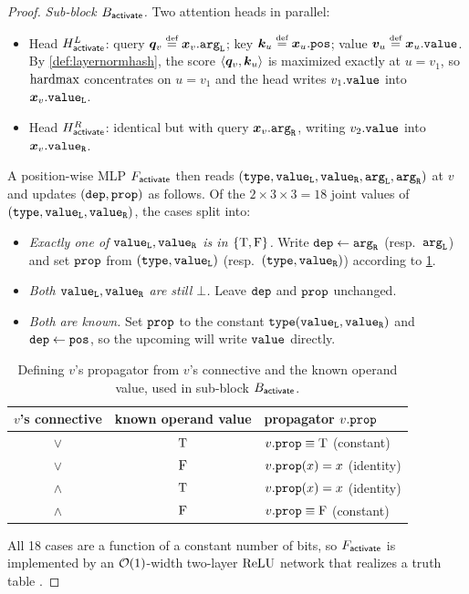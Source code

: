 \documentclass{article}
\begin{document}
\begin{proof}
    \emph{Sub-block $B_{{\textsf{activate}}}$.}
    Two attention heads in parallel:
    \begin{itemize}[noitemsep,topsep=0pt,leftmargin=15pt,parsep=0pt]
        \item Head $H^L_{{\textsf{activate}}}$: query $\vq_v \defeq \vx_v.\fargL$; key $\vk_u \defeq \vx_u.\fpos$; value $\vv_u \defeq \vx_u.\fval$. By \cref{def:layernormhash}, the score $\langle {{{ \bm{q}}}}_v, {{{ \bm{k}}}}_u \rangle$ is maximized exactly at $u = v_1$, so ${{\mathrm{hardmax}}}$ concentrates on $u = v_1$ and the head writes $v_1.{\mathtt{value}}$ into ${{{ \bm{x}}}}_v.{\mathtt{value}_\mathtt{L}}$.
        \item Head $H^R_{{\textsf{activate}}}$: identical but with query ${{{ \bm{x}}}}_v.{\mathtt{arg}_\mathtt{R}}$, writing $v_2.{\mathtt{value}}$ into ${{{ \bm{x}}}}_v.{\mathtt{value}_\mathtt{R}}$.
    \end{itemize}
    A position-wise MLP $F_{{\textsf{activate}}}$ then reads $({\mathtt{type}}, {\mathtt{value}_\mathtt{L}}, {\mathtt{value}_\mathtt{R}}, {\mathtt{arg}_\mathtt{L}}, {\mathtt{arg}_\mathtt{R}})$ at $v$ and updates $({\mathtt{dep}}, {\mathtt{prop}})$ as follows.
    Of the $2 \times 3 \times 3 = 18$ joint values of $({\mathtt{type}}, {\mathtt{value}_\mathtt{L}}, {\mathtt{value}_\mathtt{R}})$, the cases split into:
    \begin{itemize}[noitemsep,topsep=0pt,leftmargin=15pt,parsep=0pt]
        \item \emph{Exactly one of ${\mathtt{value}_\mathtt{L}}, {\mathtt{value}_\mathtt{R}}$ is in ${{\{ {\mathbin{\mathrm{T}}}, {\mathbin{\mathrm{F}}} \}}}$.} Write ${\mathtt{dep}} \gets {\mathtt{arg}_\mathtt{R}}$ (resp.\ ${\mathtt{arg}_\mathtt{L}}$) and set ${\mathtt{prop}}$ from $({\mathtt{type}}, {\mathtt{value}_\mathtt{L}})$ (resp.\ $({\mathtt{type}}, {\mathtt{value}_\mathtt{R}})$) according to \cref{tab:activate}.
        \item \emph{Both ${\mathtt{value}_\mathtt{L}}, {\mathtt{value}_\mathtt{R}}$ are still $\bot$.} Leave ${\mathtt{dep}}$ and ${\mathtt{prop}}$ unchanged.
        \item \emph{Both are known.} Set ${\mathtt{prop}}$ to the constant ${\mathtt{type}}({\mathtt{value}_\mathtt{L}}, {\mathtt{value}_\mathtt{R}})$ and ${\mathtt{dep}} \gets {\mathtt{pos}}$, so the upcoming \pebbleStep will write ${\mathtt{value}}$ directly.
    \end{itemize}
    \begin{table}[H]
        \centering
        \begin{tabular}{@{}ccl@{}}
            \toprule
            $v$'s connective & known operand value & propagator $v.{\mathtt{prop}}$ \\
            \midrule
            $\lor$  & ${\mathbin{\mathrm{T}}}$  & $v.{\mathtt{prop}} \equiv {\mathbin{\mathrm{T}}}$ (constant) \\
            $\lor$  & ${\mathbin{\mathrm{F}}}$ & $v.{\mathtt{prop}}(x) = x$ (identity) \\
            $\land$ & ${\mathbin{\mathrm{T}}}$  & $v.{\mathtt{prop}}(x) = x$ (identity) \\
            $\land$ & ${\mathbin{\mathrm{F}}}$ & $v.{\mathtt{prop}} \equiv {\mathbin{\mathrm{F}}}$ (constant) \\
            \bottomrule
        \end{tabular}
        \caption{Defining $v$'s propagator from $v$'s connective and the known operand value, used in sub-block $B_{{\textsf{activate}}}$.}
        \label{tab:activate}
    \end{table}
    All 18 cases are a function of a constant number of bits, so $F_{{\textsf{activate}}}$ is implemented by an ${{ \mathcal{O}}}(1)$-width two-layer ${{ \mathrm{ReLU}}}$ network that realizes a truth table \citep{yang2025transformercookbook}.
    

\end{proof}
\end{document}

